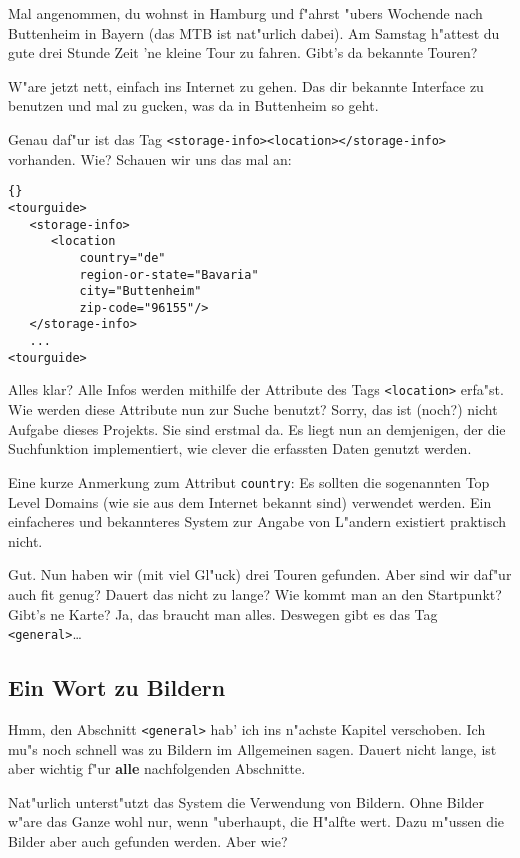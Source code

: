 Mal angenommen, du wohnst in Hamburg und f"ahrst "ubers Wochende
nach Buttenheim in Bayern (das MTB ist nat"urlich dabei). Am
Samstag h"attest du gute drei Stunde Zeit 'ne kleine Tour zu
fahren. Gibt's da bekannte Touren?

W"are jetzt nett, einfach ins Internet zu gehen. Das dir 
bekannte Interface zu benutzen und mal zu gucken, was da in
Buttenheim so geht.

Genau daf"ur ist das Tag \texttt{<storage-info><location></storage-info>}
vorhanden. Wie? Schauen wir uns das mal an:

\lstset{numbers=left,numberstyle=\tiny,stepnumber=1}
\begin{lstlisting}{}
<tourguide>
   <storage-info>
      <location 
          country="de" 
          region-or-state="Bavaria" 
          city="Buttenheim" 
          zip-code="96155"/>
   </storage-info>
   ...
<tourguide>
\end{lstlisting}

Alles klar? Alle Infos werden mithilfe der Attribute des Tags
\texttt{<location>} erfa"st. Wie werden diese Attribute nun 
zur Suche benutzt? Sorry, das ist (noch?) nicht Aufgabe dieses
Projekts. Sie sind erstmal da. Es liegt nun an demjenigen, der
die Suchfunktion implementiert, wie clever die erfassten Daten
genutzt werden.

Eine kurze Anmerkung zum Attribut \texttt{country}: Es sollten
die sogenannten Top Level Domains (wie sie aus dem Internet
bekannt sind) verwendet werden. Ein einfacheres und bekannteres 
System zur Angabe von L"andern existiert praktisch nicht.

Gut. Nun haben wir (mit viel Gl"uck) drei Touren gefunden.
Aber sind wir daf"ur auch fit genug? Dauert das nicht zu 
lange? Wie kommt man an den Startpunkt? Gibt's ne Karte?
Ja, das braucht man alles. Deswegen gibt es das Tag
\texttt{<general>}\ldots

\subsection{Ein Wort zu Bildern}\label{sec:image_references}
Hmm, den Abschnitt \texttt{<general>} hab' ich ins n"achste
Kapitel verschoben. Ich mu"s noch schnell was zu Bildern
im Allgemeinen sagen. Dauert nicht lange, ist aber wichtig
f"ur \textbf{alle} nachfolgenden Abschnitte.

Nat"urlich unterst"utzt das System die Verwendung von Bildern.
Ohne Bilder w"are das Ganze wohl nur, wenn "uberhaupt, die
H"alfte wert. Dazu m"ussen die Bilder aber auch  gefunden
werden. Aber wie?

